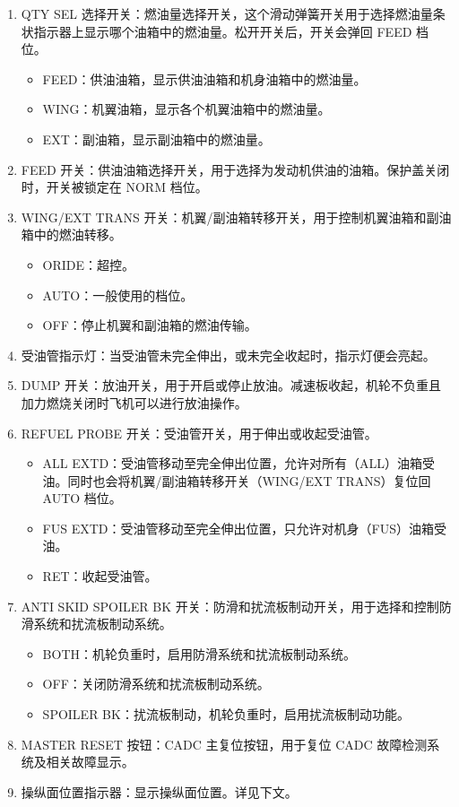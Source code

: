 \begin{enumerate}
	\item QTY SEL 选择开关：燃油量选择开关，这个滑动弹簧开关用于选择燃油量条状指示器上显示哪个油箱中的燃油量。松开开关后，开关会弹回 FEED 档位。
	      \begin{itemize}
		      \item FEED：供油油箱，显示供油油箱和机身油箱中的燃油量。
		      \item WING：机翼油箱，显示各个机翼油箱中的燃油量。
		      \item EXT：副油箱，显示副油箱中的燃油量。
	      \end{itemize}
	\item FEED 开关：供油油箱选择开关，用于选择为发动机供油的油箱。保护盖关闭时，开关被锁定在 NORM 档位。
	\item WING/EXT TRANS 开关：机翼/副油箱转移开关，用于控制机翼油箱和副油箱中的燃油转移。
	      \begin{itemize}
		      \item ORIDE：超控。
		      \item AUTO：一般使用的档位。
		      \item OFF：停止机翼和副油箱的燃油传输。
	      \end{itemize}
	\item 受油管指示灯：当受油管未完全伸出，或未完全收起时，指示灯便会亮起。
	\item DUMP 开关：放油开关，用于开启或停止放油。减速板收起，机轮不负重且加力燃烧关闭时飞机可以进行放油操作。
	\item REFUEL PROBE 开关：受油管开关，用于伸出或收起受油管。
	      \begin{itemize}
		      \item ALL EXTD：受油管移动至完全伸出位置，允许对所有（ALL）油箱受油。同时也会将机翼/副油箱转移开关（WING/EXT TRANS）复位回 AUTO 档位。
		      \item FUS EXTD：受油管移动至完全伸出位置，只允许对机身（FUS）油箱受油。
		      \item RET：收起受油管。
	      \end{itemize}
	\item ANTI SKID SPOILER BK 开关：防滑和扰流板制动开关，用于选择和控制防滑系统和扰流板制动系统。
	      \begin{itemize}
		      \item BOTH：机轮负重时，启用防滑系统和扰流板制动系统。
		      \item OFF：关闭防滑系统和扰流板制动系统。
		      \item SPOILER BK：扰流板制动，机轮负重时，启用扰流板制动功能。
	      \end{itemize}
	\item MASTER RESET 按钮：CADC 主复位按钮，用于复位 CADC 故障检测系统及相关故障显示。
	\item 操纵面位置指示器：显示操纵面位置。详见下文。
\end{enumerate}

